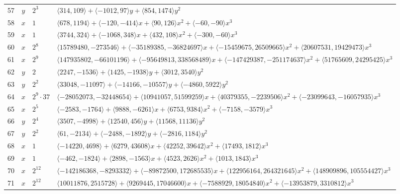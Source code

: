 \documentclass[11pt]{article}
\begin{document}
{\begin{longtable}{@{}rcl>{\raggedright\arraybackslash}p{}@{}}
57 & $y$ & $2^{3}$ & $\langle 314,109\rangle+\langle -1012,97\rangle y+\langle 854,1474\rangle y^{2}$\\
58 & $x$ & $1$ & $\langle 678,1194\rangle+\langle -120,-414\rangle x+\langle 90,126\rangle x^{2}+\langle -60,-90\rangle x^{3}$\\
59 & $x$ & $1$ & $\langle 3744,324\rangle+\langle -1068,348\rangle x+\langle 432,108\rangle x^{2}+\langle -300,-60\rangle x^{3}$\\
60 & $x$ & $2^{8}$ & $\langle 15789480,-273546\rangle+\langle -35189385,-36824697\rangle x+\langle -15459675,26509665\rangle x^{2}+\langle 20607531,19429473\rangle x^{3}$\\
61 & $x$ & $2^{9}$ & $\langle 147935802,-66101196\rangle+\langle -95649813,338568489\rangle x+\langle -147429387,-251174637\rangle x^{2}+\langle 51765609,24295425\rangle x^{3}$\\
62 & $y$ & $2$ & $\langle 2247,-1536\rangle+\langle 1425,-1938\rangle y+\langle 3012,3540\rangle y^{2}$\\
63 & $y$ & $2^{2}$ & $\langle 33048,-11097\rangle+\langle -14166,-10557\rangle y+\langle -4860,5922\rangle y^{2}$\\
64 & $x$ & $2^{9}\cdot 37$ & $\langle -28052073,-32448654\rangle+\langle 10941057,51599259\rangle x+\langle 40379355,-2239506\rangle x^{2}+\langle -23099643,-16057935\rangle x^{3}$\\
65 & $x$ & $2^{5}$ & $\langle -2583,-1764\rangle+\langle 9888,-6261\rangle x+\langle 6753,9384\rangle x^{2}+\langle -7158,-3579\rangle x^{3}$\\
66 & $y$ & $2^{4}$ & $\langle 3507,-4998\rangle+\langle 12540,456\rangle y+\langle 11568,11136\rangle y^{2}$\\
67 & $y$ & $2^{2}$ & $\langle 61,-2134\rangle+\langle -2488,-1892\rangle y+\langle -2816,1184\rangle y^{2}$\\
68 & $x$ & $1$ & $\langle -14220,4698\rangle+\langle 6279,43608\rangle x+\langle 42252,39642\rangle x^{2}+\langle 17493,1812\rangle x^{3}$\\
69 & $x$ & $1$ & $\langle -462,-1824\rangle+\langle 2898,-1563\rangle x+\langle 4523,2626\rangle x^{2}+\langle 1013,1843\rangle x^{3}$\\
70 & $x$ & $2^{12}$ & $\langle -142186368,-8293332\rangle+\langle -89872500,172685535\rangle x+\langle 122956164,264321645\rangle x^{2}+\langle 148909896,105554427\rangle x^{3}$\\
71 & $x$ & $2^{12}$ & $\langle 10011876,2515728\rangle+\langle 9269445,17046600\rangle x+\langle -7588929,18054840\rangle x^{2}+\langle -13953879,3310812\rangle x^{3}$\\

\end{longtable}}
\end{document}
